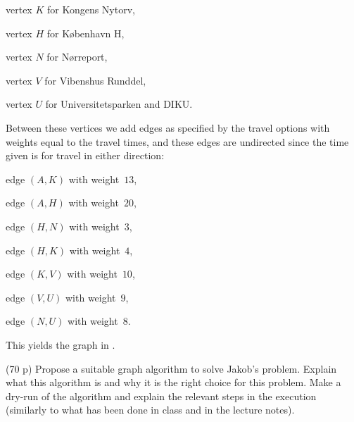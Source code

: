 \documentclass{jn-pset}
\begin{document}
\begin{problem}
\begin{solution}
\begin{compactitem}
  
    
  \item vertex 
    $K$ for Kongens Nytorv,

  \item vertex 
    $H$ for København H,

  \item vertex 
    $N$ for Nørreport,

  \item vertex 
    $V$ for Vibenshus Runddel,

  \item vertex 
    $U$ for Universitetsparken and DIKU.

  \end{compactitem}
%  
  Between these vertices we add edges as specified by the travel options 
  with weights equal to the travel
  times, and these edges are undirected since 
  the time given is for  travel in either direction:
  \begin{compactitem}
  \item edge 
    $(A, K)$ with weight~$13$,
    
  \item edge 
    $(A, H)$ with weight~$20$,
    
  \item edge 
    $(H, N)$ with weight~$3$,
    
  \item edge 
    $(H, K)$ with weight~$4$,

  \item edge 
    $(K, V)$ with weight~$10$,

  \item edge 
    $(V, U)$ with weight~$9$,

  \item edge 
    $(N, U)$ with weight~$8$.
  \end{compactitem}
%
  This yields the graph in
  .
  
\end{solution}


\begin{subproblem}
    {(70 p)}
    {\ignorespaces}
    Propose a suitable graph algorithm to solve Jakob's problem.
    Explain what this algorithm is and why it is the right choice for
    this problem.  Make a dry-run of the algorithm and explain the
    relevant steps in the execution (similarly to what has been done
    in class and in the lecture notes).
    

\end{subproblem}
\end{problem}
\end{document}
